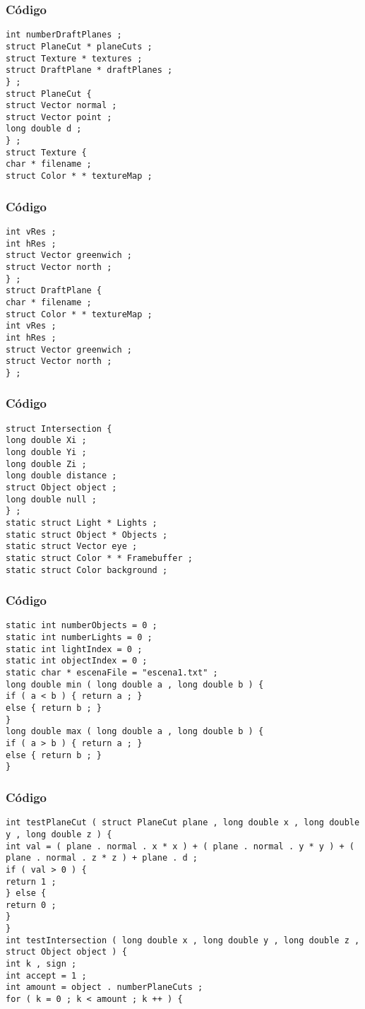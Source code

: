 \documentclass{beamer}
\begin{document}
\begin{frame}[fragile]
\frametitle{C\'odigo}
\begin{verbatim}
int numberDraftPlanes ; 
struct PlaneCut * planeCuts ; 
struct Texture * textures ; 
struct DraftPlane * draftPlanes ; 
} ; 
struct PlaneCut { 
struct Vector normal ; 
struct Vector point ; 
long double d ; 
} ; 
struct Texture { 
char * filename ; 
struct Color * * textureMap ; 
\end{verbatim}
\end{frame}
\begin{frame}[fragile]
\frametitle{C\'odigo}
\begin{verbatim}
int vRes ; 
int hRes ; 
struct Vector greenwich ; 
struct Vector north ; 
} ; 
struct DraftPlane { 
char * filename ; 
struct Color * * textureMap ; 
int vRes ; 
int hRes ; 
struct Vector greenwich ; 
struct Vector north ; 
} ; 
\end{verbatim}
\end{frame}
\begin{frame}[fragile]
\frametitle{C\'odigo}
\begin{verbatim}
struct Intersection { 
long double Xi ; 
long double Yi ; 
long double Zi ; 
long double distance ; 
struct Object object ; 
long double null ; 
} ; 
static struct Light * Lights ; 
static struct Object * Objects ; 
static struct Vector eye ; 
static struct Color * * Framebuffer ; 
static struct Color background ; 
\end{verbatim}
\end{frame}
\begin{frame}[fragile]
\frametitle{C\'odigo}
\begin{verbatim}
static int numberObjects = 0 ; 
static int numberLights = 0 ; 
static int lightIndex = 0 ; 
static int objectIndex = 0 ; 
static char * escenaFile = "escena1.txt" ; 
long double min ( long double a , long double b ) { 
if ( a < b ) { return a ; } 
else { return b ; } 
} 
long double max ( long double a , long double b ) { 
if ( a > b ) { return a ; } 
else { return b ; } 
} 
\end{verbatim}
\end{frame}
\begin{frame}[fragile]
\frametitle{C\'odigo}
\begin{verbatim}
int testPlaneCut ( struct PlaneCut plane , long double x , long double y , long double z ) { 
int val = ( plane . normal . x * x ) + ( plane . normal . y * y ) + ( plane . normal . z * z ) + plane . d ; 
if ( val > 0 ) { 
return 1 ; 
} else { 
return 0 ; 
} 
} 
int testIntersection ( long double x , long double y , long double z , struct Object object ) { 
int k , sign ; 
int accept = 1 ; 
int amount = object . numberPlaneCuts ; 
for ( k = 0 ; k < amount ; k ++ ) { 
\end{verbatim}
\end{frame}
\end{document}
